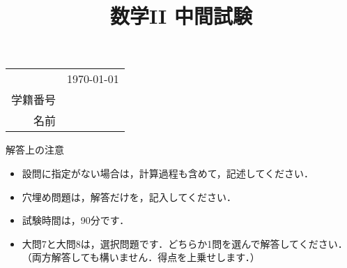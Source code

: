 \title{数学II 中間試験}
\date{}
\maketitle

\vspace*{-2cm}
\begin{table}[!h]
	\begin{flushright}
		\begin{tabular}{rc}
			\vspace*{0.1in} & \usdate\today\\
			学籍番号 & \vspace{0.1in} \\
			名前 & \vspace{0.1in} \\
		\end{tabular}
	\end{flushright}
\end{table}

\begin{itembox}[c]{解答上の注意}
	\begin{itemize}
		\item 設問に指定がない場合は，計算過程も含めて，記述してください．
		\item 穴埋め問題は，解答だけを，記入してください．
		\item 試験時間は，90分です．
		\item 大問7と大問8は，選択問題です．どちらか1問を選んで解答してください．（両方解答しても構いません．得点を上乗せします．）
	\end{itemize}
\end{itembox}

